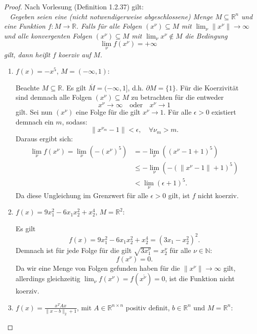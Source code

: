 \documentclass[12pt]{extreport} %
\newcommand{\N}{\mathbb{N}}
\newcommand{\R}{\mathbb{R}}
\theoremstyle{named}
\theoremstyle{nnamed}
\theoremstyle{itshape}
\theoremstyle{normal}
\begin{document}
\begin{proof} Nach Vorlesung (Definition 1.2.37) gilt: ~\\ ~\medskip
	\textit{Gegeben seien eine (nicht notwendigerweise abgeschlossene) Menge $M \subseteq \R^n$ und eine Funktion $f \colon M \rightarrow \R$. Falls für alle Folgen $(x^\nu) \subseteq M$ mit $\lim_{\nu} \| x^\nu \| \rightarrow \infty$ und alle konvergenten Folgen $(x^\nu) \subseteq M$ mit $\lim_{\nu} x^\nu \notin M$ die Bedingung}
	$$ \lim_{\nu} f(x^\nu) = + \infty $$
	\textit{gilt, dann heißt $f$ koerziv auf $M$.} ~\\
	
	\begin{enumerate} %
		\item $f(x) = - x^5$, $M =(- \infty, 1)$: ~\medskip
		
			Beachte $M \subseteq \R$. Es gilt $\overline{M} = (-\infty, 1]$, d.h. $\partial M = \{ 1 \}$. Für die Koerzivität sind demnach alle Folgen $\left( x^\nu \right) \subseteq M$ zu betrachten für die entweder
			$$ x^\nu \longrightarrow \infty \quad \text{oder} \quad x^\nu \longrightarrow 1 $$
			gilt. Sei nun $(x^\nu)$ eine Folge für die gilt $x^\nu \rightarrow 1$. Für alle $\epsilon > 0$ existiert demnach ein $m$, sodass:
			$$ \| x^{\nu_m} - 1 \| < \epsilon, \quad \forall \nu_m > m. $$
			Daraus ergibt sich:
			\begin{align*}
				 \lim_\nu f(x^\nu) = \lim_\nu \left( - \left(x^\nu \right)^5 \right) & = -  \lim_\nu \left( \left(x^\nu - 1 + 1 \right)^5 \right) \\
				 	& \leq - \lim_\nu  \left( - \left( \| x^\nu -1 \| + 1 \right)^5 \right) \\
				 	& < \lim_\nu  \left( \epsilon + 1 \right)^5.  
			\end{align*}
			Da diese Ungleichung im Grenzwert für alle $\epsilon > 0$ gilt, ist $f$ nicht koerziv. ~\\ 
		\item  $f(x) = 9 x_1^2 - 6 x_1 x_2^2 + x_2^4$, $M = \R^2$: ~\medskip
		
			Es gilt
			$$ f(x) = 9 x_1^2 - 6 x_1 x_2^2 + x_2^4 = (3 x_1 - x_2^2)^2. $$
			Demnach ist für jede Folge für die gilt $\sqrt{3 x^\nu_1} = x^\nu_2$ für alle $\nu \in \N$:
			$$ f(x^\nu) = 0. $$
			Da wir eine Menge von Folgen gefunden haben für die $\| x^\nu \| \rightarrow \infty$ gilt, allerdings gleichzeitig $\lim_{\nu} f(x^\nu) = f(x^{\tilde{\nu}}) = 0$, ist die Funktion nicht koerziv. ~\\ 
		\item $f(x) = \frac{x^T A x}{\| x - b\|_2 + 1}$, mit $A \in \R^{n \times n}$ positiv definit, $b \in \R^n$ und $M = \R^n$: ~\medskip
		

\end{enumerate}
\end{proof}
\end{document}
